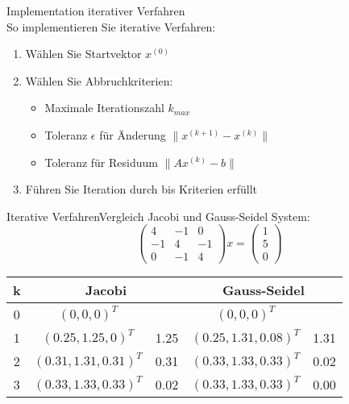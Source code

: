 \begin{KR}{Implementation iterativer Verfahren}\\
So implementieren Sie iterative Verfahren:
\begin{enumerate}
    \item Wählen Sie Startvektor $x^{(0)}$
    \item Wählen Sie Abbruchkriterien:
        \begin{itemize}
            \item Maximale Iterationszahl $k_{max}$
            \item Toleranz $\epsilon$ für Änderung $\|x^{(k+1)} - x^{(k)}\|$
            \item Toleranz für Residuum $\|Ax^{(k)} - b\|$
        \end{itemize}
    \item Führen Sie Iteration durch bis Kriterien erfüllt
\end{enumerate}
\end{KR}

\begin{example2}{Iterative Verfahren}{Vergleich Jacobi und Gauss-Seidel}
System:
$$\begin{pmatrix}
4 & -1 & 0\\
-1 & 4 & -1\\
0 & -1 & 4
\end{pmatrix}x = \begin{pmatrix}
1\\
5\\
0
\end{pmatrix}$$

\begin{center}
\begin{tabular}{c|cc|cc}
k & \multicolumn{2}{c|}{Jacobi} & \multicolumn{2}{c}{Gauss-Seidel}\\
\hline
0 & $(0,0,0)^T$ & & $(0,0,0)^T$ &\\
1 & $(0.25,1.25,0)^T$ & 1.25 & $(0.25,1.31,0.08)^T$ & 1.31\\
2 & $(0.31,1.31,0.31)^T$ & 0.31 & $(0.33,1.33,0.33)^T$ & 0.02\\
3 & $(0.33,1.33,0.33)^T$ & 0.02 & $(0.33,1.33,0.33)^T$ & 0.00
\end{tabular}
\end{center}
\end{example2}

